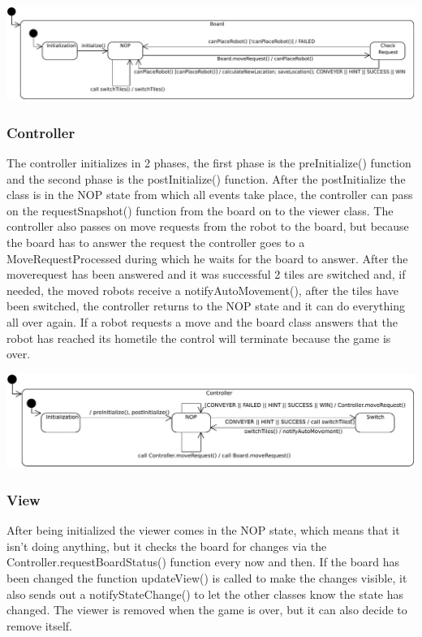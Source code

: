 	\includegraphics[width=\linewidth]{statecharts/board.pdf}

	\subsubsection{Controller}
	The controller initializes in 2 phases, the first phase is the preInitialize() function and the second phase is the postInitialize() function. After the postInitialize the class is in the NOP state from which all events take place, the controller can pass on the requestSnapshot() function from the board on to the viewer class. The controller also passes on move requests from the robot to the board, but because the  board has to answer the request the controller goes to a MoveRequestProcessed during which he waits for the board to answer. After the moverequest has been answered and it was successful 2 tiles are switched and, if needed, the moved robots receive a notifyAutoMovement(), after the tiles have been switched, the controller returns to the NOP state and it can do everything all over again. If a robot requests a move and the board class answers that the robot has reached its hometile the control will terminate because the game is over.

	\includegraphics[width=\linewidth]{statecharts/controller.pdf}

	\subsubsection{View}
	After being initialized the viewer comes in the NOP state, which means that it isn't doing anything, but it checks the board for changes via the Controller.requestBoardStatus() function every now and then. If the board has been changed the function updateView() is called to make the changes visible, it also sends out a notifyStateChange() to let the other classes know the state has changed. The viewer is removed when the game is over, but it can also decide to remove itself.
	
